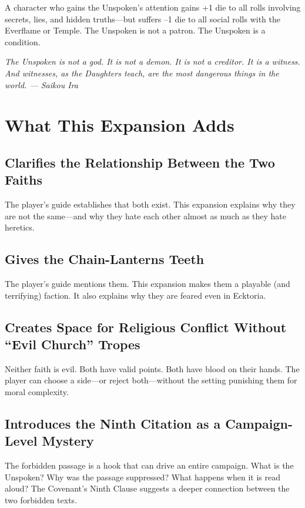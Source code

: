 \documentclass{book}
\newcommand{\citation}[1]{\textcolor{marginalia}{\small\textit{#1}}}
\begin{document}
A character who gains the Unspoken's attention gains +1 die to all rolls involving secrets, lies, and hidden truths---but suffers --1 die to all social rolls with the Everflame or Temple. The Unspoken is not a patron. The Unspoken is a condition.

\citation{The Unspoken is not a god. It is not a demon. It is not a creditor. It is a \textit{witness}. And witnesses, as the Daughters teach, are the most dangerous things in the world. --- Saikou Ira}

\part{What This Expansion Adds}

\chapter{Clarifies the Relationship Between the Two Faiths}

The player's guide establishes that both exist. This expansion explains why they are not the same---and why they hate each other almost as much as they hate heretics.

\chapter{Gives the Chain-Lanterns Teeth}

The player's guide mentions them. This expansion makes them a playable (and terrifying) faction. It also explains why they are feared even in Ecktoria.

\chapter{Creates Space for Religious Conflict Without ``Evil Church'' Tropes}

Neither faith is evil. Both have valid points. Both have blood on their hands. The player can choose a side---or reject both---without the setting punishing them for moral complexity.

\chapter{Introduces the Ninth Citation as a Campaign-Level Mystery}

The forbidden passage is a hook that can drive an entire campaign. What is the Unspoken? Why was the passage suppressed? What happens when it is read aloud? The Covenant's Ninth Clause suggests a deeper connection between the two forbidden texts.
\end{document}
